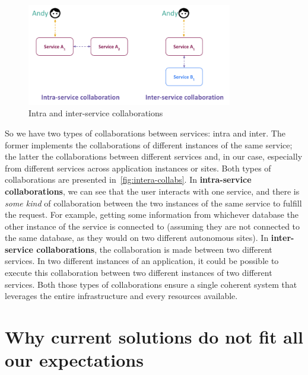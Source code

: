 \begin{figure}[htbp]
  \centering
  \includegraphics[width=0.8\textwidth]{figs/pdf/collaborations}
  \caption{Intra and inter-service collaborations}
  \label{fig:intera-collabs}
\end{figure}

So we have two types of collaborations between services: intra and
inter.
%
The former implements the collaborations of different instances
of the same service; the latter the collaborations between different
services and, in our case, especially from different services across
application instances or sites.
%
Both types of collaborations are presented
in~\autoref{fig:intera-collabs}.
%
In \textbf{intra-service collaborations}, we can see that the user interacts
with one service, and there is \emph{some kind} of collaboration
between the two instances of the same service to fulfill the request.
%
For example, getting some information from whichever database the
other instance of the service is connected to (assuming they are not
connected to the same database, as they would on two different
autonomous sites).
%
In \textbf{inter-service collaborations}, the
collaboration is made between two different services.
%
In two different instances of an application, it could be possible to
execute this collaboration between two different instances of two
different services.
%
Both those types of collaborations ensure a single coherent
system that leverages the entire infrastructure and every resources
available.
%


\section{Why current solutions do not fit all our expectations} %
\label{sec:why-no}



